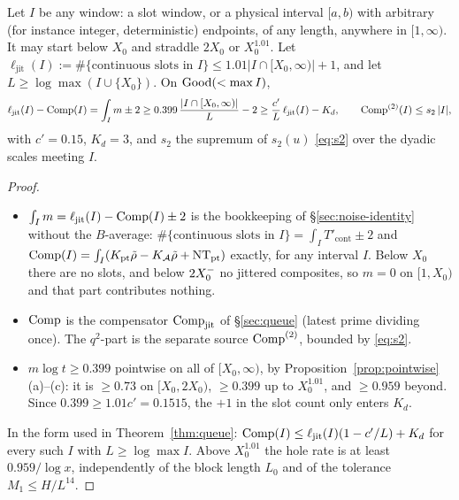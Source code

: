 \begin{corollary}\label{cor:r1}
Let $I$ be any window: a slot window, or a physical interval $[a,b)$ with arbitrary (for instance integer, deterministic)
endpoints, of any length, anywhere in $[1,\infty)$. It may start below $X_0$ and straddle $2X_0$ or $X_0^{1.01}$. Let
$\ell_{\mathrm{jit}}(I):=\#\{\text{continuous slots in }I\}\le1.01|I\cap[X_0,\infty)|+1$, and let
$L\ge\log\max(I\cup\{X_0\})$. On $\mathrm{Good}(<\max I)$,
\[
  \ell_{\mathrm{jit}}(I)-\mathrm{Comp}(I)=\int_Im\pm2\ge0.399\,\frac{|I\cap[X_0,\infty)|}L-2\ge\frac{c'}L\,\ell_{\mathrm{jit}}(I)-K_d,
  \qquad\mathrm{Comp}^{(2)}(I)\le s_2\,|I|,
\]
with $c'=0.15$, $K_d=3$, and $s_2$ the supremum of $s_2(u)$ \eqref{eq:s2} over the dyadic scales meeting $I$.
\end{corollary}

\begin{proof}
\begin{itemize}
\item $\int_Im=\ell_{\mathrm{jit}}(I)-\mathrm{Comp}(I)\pm2$ is the bookkeeping of \S\ref{sec:noise-identity} without the $B$-average:
  $\#\{\text{continuous slots in }I\}=\int_IT'_{\mathrm{cont}}\pm2$ and $\mathrm{Comp}(I)=\int_I(K_{\mathrm{pt}}\tilde\rho-K_{\mathcal{A}}\tilde\rho+\mathrm{NT}_{\mathrm{pt}})$
  exactly, for any interval $I$. Below $X_0$ there are no slots, and below $2X_0^{-}$ no jittered composites, so $m=0$ on
  $[1,X_0)$ and that part contributes nothing.
\item $\mathrm{Comp}$ is the compensator $\mathrm{Comp}_{\mathrm{jit}}$ of \S\ref{sec:queue} (latest prime dividing once). The $q^2$-part is
  the separate source $\mathrm{Comp}^{(2)}$, bounded by \eqref{eq:s2}.
\item $m\log t\ge0.399$ pointwise on all of $[X_0,\infty)$, by Proposition~\ref{prop:pointwise}(a)--(c): it is $\ge0.73$ on
  $[X_0,2X_0)$, $\ge0.399$ up to $X_0^{1.01}$, and $\ge0.959$ beyond. Since $0.399\ge1.01c'=0.1515$, the $+1$ in the slot count
  only enters $K_d$.
\end{itemize}
In the form used in Theorem~\ref{thm:queue}: $\mathrm{Comp}(I)\le\ell_{\mathrm{jit}}(I)(1-c'/L)+K_d$ for every such $I$ with
$L\ge\log\max I$. Above $X_0^{1.01}$ the hole rate is at least $0.959/\log x$, independently of the block length $L_0$ and of
the tolerance $M_1\le H/L^{14}$.
\end{proof}
